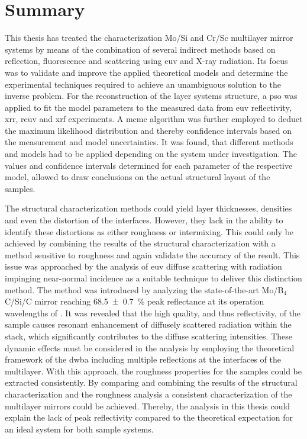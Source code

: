 \chapter{Summary} \label{ch_summary}
This thesis has treated the characterization Mo/Si and Cr/Sc multilayer mirror systems by means of the combination of several indirect methods based on reflection, fluorescence and scattering using \gls{euv} and X-ray radiation. Its focus was to validate and improve the applied theoretical models and determine the experimental techniques required to achieve an unambiguous solution to the inverse problem. For the reconstruction of the layer systems structure, a \glsdesc{pso} was applied to fit the model parameters to the measured data from \glsdesc{euv} reflectivity, \glsdesc{xrr}, \glsdesc{reuv} and \glsdesc{xrf} experiments. A \glsdesc{mcmc} algorithm was further employed to deduct the maximum likelihood distribution and thereby confidence intervals based on the measurement and model uncertainties. It was found, that different methods and models had to be applied depending on the system under investigation. The values and confidence intervals determined for each parameter of the respective model, allowed to draw conclusions on the actual structural layout of the samples.

The structural characterization methods could yield layer thicknesses, densities and even the distortion of the interfaces. However, they lack in the ability to identify these distortions as either roughness or intermixing. This could only be achieved by combining the results of the structural characterization with a method sensitive to roughness and again validate the accuracy of the result. This issue was approached by the analysis of \gls{euv} diffuse scattering with radiation impinging near-normal incidence as a suitable technique to deliver this distinction method. The method was introduced by analyzing the state-of-the-art Mo/B$_4$C/Si/C mirror reaching \SI{68.5 \pm 0.7}{\percent} peak reflectance at its operation wavelengths of . It was revealed that the high quality, and thus reflectivity, of the sample causes resonant enhancement of diffusely scattered radiation within the stack, which significantly contributes to the diffuse scattering intensities. These dynamic effects must be considered in the analysis by employing the theoretical framework of the \glsdesc{dwba} including multiple reflections at the interfaces of the multilayer. With this approach, the roughness properties for the samples could be extracted consistently. By comparing and combining the results of the structural characterization and the roughness analysis a consistent characterization of the multilayer mirrors could be achieved. Thereby, the analysis in this thesis could explain the lack of peak reflectivity compared to the theoretical expectation for an ideal system for both sample systems.

